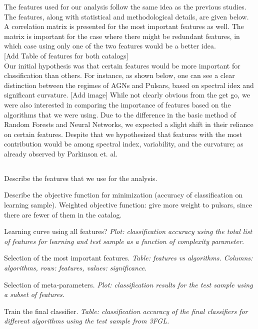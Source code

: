 The features used for our analysis follow the same idea as the previous studies. The features, along with statistical and methodological details, are given below. A correlation matrix is presented for the most important features as well. The matrix is important for the case where there might be redundant features, in which case using only one of the two features would be a better idea.\\



[Add Table of features for both catalogs]\\

Our initial hypothesis was that certain features would be more important for classification than others. For instance, as shown below, one can see a clear distinction between the regimes of AGNs and Pulsars, based on spectral idex and significant curvature. [Add image] While not clearly obvious from the get go, we were also interested in comparing the importance of features based on the algorithms that we were using. Due to the difference in the basic method of Random Forests and Neural Networks, we expected a slight shift in their reliance on certain features. Despite that we hypothesized that features with the most contribution would be among spectral index, variability, and the curvature; as already observed by Parkinson et. al.\\


\subsection{}


\ben
\item
Describe the features that we use for the analysis.
\item
Describe the objective function for minimization (accuracy of classification on learning sample).
Weighted objective function: give more weight to pulsars, since there are fewer of them in the catalog.
\item
Learning curve using all features?
{\it Plot: classification accuracy using the total list of features for learning and test sample as a function of complexity parameter.}
\item
Selection of the most important features.
{\it Table: features vs algorithms. Columns: algorithms, rows: features, values: significance.}
\item
Selection of meta-parameters.
{\it Plot: classification results for the test sample using a subset of features.}
\item
Train the final classifier.
{\it Table: classification accuracy of the final classifiers for different algorithms using the test sample from 3FGL.}
\een

